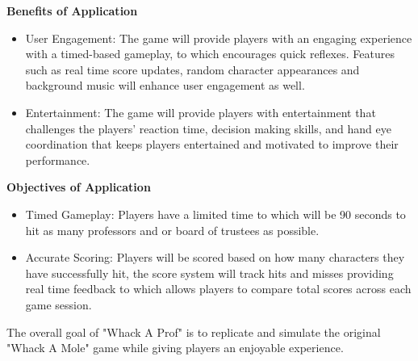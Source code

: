 \documentclass{article}
\begin{document}
\textbf{Benefits of Application}
\begin{itemize}
    \item User Engagement: The game will provide players with an engaging experience with a timed-based gameplay, to which encourages quick reflexes. Features such as real time score updates, random character appearances and background music will enhance user engagement as well. 
    \item Entertainment: The game will provide players with entertainment that challenges the players’ reaction time, decision making skills, and hand eye coordination that keeps players entertained and motivated to improve their performance.
\end{itemize}

\textbf{Objectives of Application}
\begin{itemize}
    \item Timed Gameplay: Players have a limited time to which will be 90 seconds to hit as many professors and or board of trustees as possible.
    \item Accurate Scoring: Players will be scored based on how many characters they have successfully hit, the score system will track hits and misses providing real time feedback to which allows players to compare total scores across each game session.
\end{itemize}

The overall goal of "Whack A Prof" is to replicate and simulate the original "Whack A Mole" game while giving players an enjoyable experience.
\end{document}
